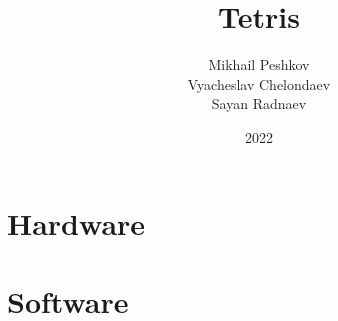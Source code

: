 \documentclass[14 pt, a4paper, leqno, oneside]{extreport}
\title{Tetris}
\author{Mikhail Peshkov \\ Vyacheslav Chelondaev \\ Sayan Radnaev}
\date{2022}
\begin{document}
	
	\maketitle
	\newpage
	\tableofcontents
	\newpage
	
	\chapter{Hardware}
	
	
	
	
	\chapter{Software}
	
\end{document}
